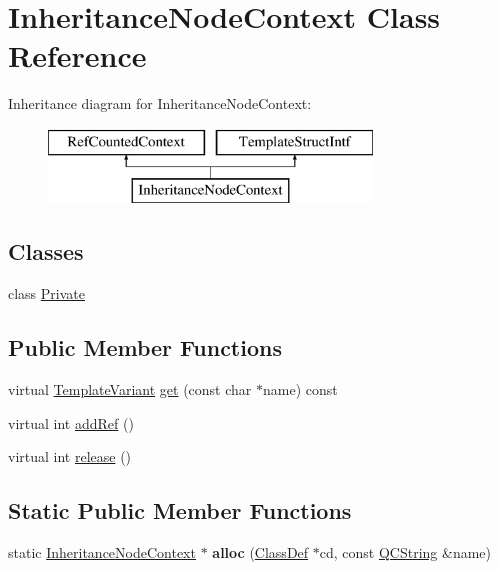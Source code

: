 \hypertarget{class_inheritance_node_context}{}\section{Inheritance\+Node\+Context Class Reference}
\label{class_inheritance_node_context}
Inheritance diagram for Inheritance\+Node\+Context\+:\begin{figure}[H]
\begin{center}
\leavevmode
\includegraphics[height=2.000000cm]{class_inheritance_node_context}
\end{center}
\end{figure}
\subsection*{Classes}
\begin{DoxyCompactItemize}
\item 
class \mbox{\hyperlink{class_inheritance_node_context_1_1_private}{Private}}
\end{DoxyCompactItemize}
\subsection*{Public Member Functions}
\begin{DoxyCompactItemize}
\item 
virtual \mbox{\hyperlink{class_template_variant}{Template\+Variant}} \mbox{\hyperlink{class_inheritance_node_context_a59624a043dc6d4af026dbe77963a2284}{get}} (const char $\ast$name) const
\item 
virtual int \mbox{\hyperlink{class_inheritance_node_context_a5184d5ea8a197cb2de5cf66b3c0a9e88}{add\+Ref}} ()
\item 
virtual int \mbox{\hyperlink{class_inheritance_node_context_a37fa7b0204b7762070d886d5c1655b8f}{release}} ()
\end{DoxyCompactItemize}
\subsection*{Static Public Member Functions}
\begin{DoxyCompactItemize}
\item 
\mbox{\label{class_inheritance_node_context_ade7b2ccc73e861ded7afbc823d30d9f5}} 
static \mbox{\hyperlink{class_inheritance_node_context}{Inheritance\+Node\+Context}} $\ast$ {\bfseries alloc} (\mbox{\hyperlink{class_class_def}{Class\+Def}} $\ast$cd, const \mbox{\hyperlink{class_q_c_string}{Q\+C\+String}} \&name)
\end{DoxyCompactItemize}


